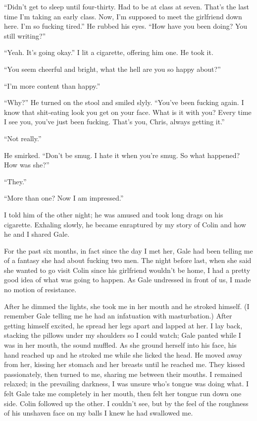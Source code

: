 ``Didn't get to sleep until four-thirty. Had to be at class at seven.
That's the last time I'm taking an early class. Now, I'm supposed to
meet the girlfriend down here. I'm so fucking tired.'' He rubbed his
eyes. ``How have you been doing? You still writing?''

``Yeah. It's going okay.'' I lit a cigarette, offering him one. He took
it.

``You seem cheerful and bright, what the hell are you so happy about?''

``I'm more content than happy.''

``Why?'' He turned on the stool and smiled slyly. ``You've been fucking
again. I know that shit-eating look you get on your face. What is it
with you? Every time I see you, you've just been fucking. That's you,
Chris, always getting it.''

``Not really.''

He smirked. ``Don't be smug. I hate it when you're smug. So what
happened? How was she?''

``They.''

``More than one? Now I am impressed.''

I told him of the other night; he was amused and took long drags on his
cigarette. Exhaling slowly, he became enraptured by my story of Colin
and how he and I shared Gale.

For the past six months, in fact since the day I met her, Gale had been
telling me of a fantasy she had about fucking two men. The night before
last, when she said she wanted to go visit Colin since his girlfriend
wouldn't be home, I had a pretty good idea of what was going to happen.
As Gale undressed in front of us, I made no motion of resistance.

After he dimmed the lights, she took me in her mouth and he stroked
himself. (I remember Gale telling me he had an infatuation with
masturbation.) After getting himself excited, he spread her legs apart
and lapped at her. I lay back, stacking the pillows under my shoulders
so I could watch; Gale panted while I was in her mouth, the sound
muffled. As she ground herself into his face, his hand reached up and he
stroked me while she licked the head. He moved away from her, kissing
her stomach and her breasts until he reached me. They kissed
passionately, then turned to me, sharing me between their mouths. I
remained relaxed; in the prevailing darkness, I was unsure who's tongue
was doing what. I felt Gale take me completely in her mouth, then felt
her tongue run down one side. Colin followed up the other. I couldn't
see, but by the feel of the roughness of his unshaven face on my balls I
knew he had swallowed me.

